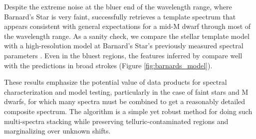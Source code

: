 \documentclass[modern]{aastex62}
\newcommand{\Mdwarf}{Barnard's Star\xspace} %
\begin{document}
Despite the extreme noise at the bluer end of the wavelength range, where \Mdwarf is very faint, \wobble successfully retrieves a template spectrum that appears consistent with general expectations for a mid-M dwarf through most of the \HARPS wavelength range. 
As a sanity check, we compare the \wobble stellar template model with a high-resolution \PHOENIX model at \Mdwarf's previously measured spectral parameters \citep[\teff = 3200 K, \logg = 5.0, and \mh = $-0.5$;][and references therein]{Husser2013, Artigau2018}. 
Even in the bluest regions, the features inferred by \wobble compare well with the \PHOENIX predictions in broad strokes (Figure \ref{fig:barnards_model}). 

These results emphasize the potential value of \wobble data products for spectral characterization and model testing, particularly in the case of faint stars and M dwarfs, for which many spectra must be combined to get a reasonably detailed composite spectrum. 
The \wobble algorithm is a simple yet robust method for doing such multi-spectra stacking while preserving telluric-contaminated regions and marginalizing over unknown \RV shifts.
\end{document}
